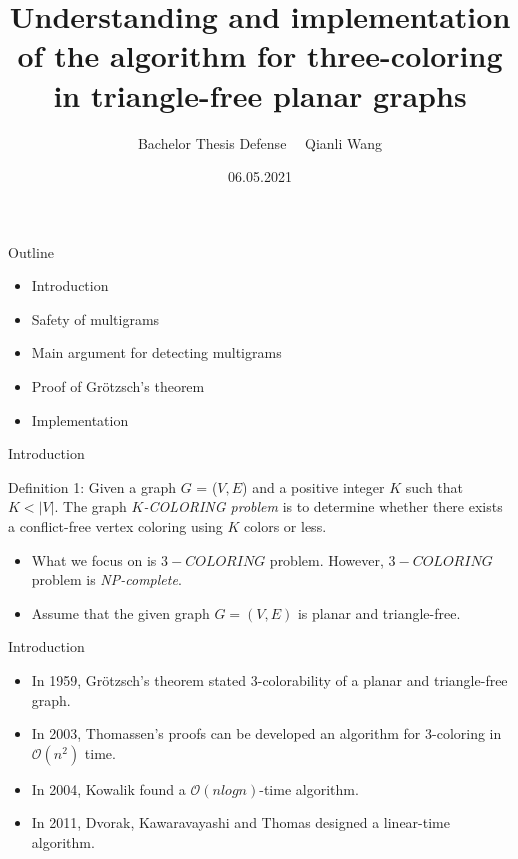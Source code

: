 \documentclass{beamer}
\title{Understanding and implementation of the algorithm for three-coloring in triangle-free planar graphs}
\author{Bachelor Thesis Defense \ \  \newline \newline Qianli Wang}
\date{06.05.2021}
\begin{document}
\maketitle

\begin{frame}{Outline}
\begin{itemize}
\item Introduction
\item Safety of multigrams
\item Main argument for detecting multigrams
\item Proof of Grötzsch's theorem
\item Implementation
\end{itemize}
\end{frame}
 

\begin{frame}{Introduction}
\begin{block}{Definition 1:}
Given a graph $G$ = ($V, E$) and a positive integer $K$ such that $K < |V|$. The graph
\textit{$K$-COLORING problem} is to determine whether there exists a conflict-free vertex coloring using $K$ colors or less.
\end{block}

\begin{itemize}
    \item What we focus on is \textit{$3-COLORING$} problem. However, \textit{$3-COLORING$} problem is \textit{NP-complete}.
    \item Assume that the given graph $G = (V, E)$ is planar and triangle-free.
\end{itemize}

\end{frame}

\begin{frame}{Introduction}
    \begin{itemize}
        \item In 1959, Grötzsch's theorem stated 3-colorability of a planar and triangle-free graph.
        \item In 2003, Thomassen's proofs can be developed an algorithm for 3-coloring in $\mathcal{O}(n^2)$ time.
        \item In 2004, Kowalik found a $\mathcal{O}(nlogn)$-time algorithm.
        \item In 2011, Dvorak, Kawaravayashi and Thomas designed a linear-time algorithm.
    \end{itemize}
\end{frame}
\end{document}
